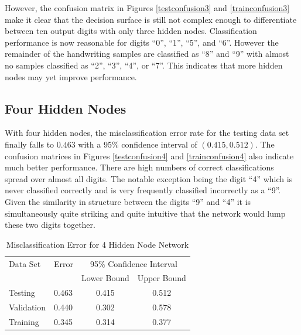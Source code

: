 \documentclass{article}
\begin{document}
However, the confusion matrix in Figures \ref{testconfusion3} and \ref{trainconfusion3} make it clear that the decision surface is still not complex enough to differentiate between ten output digits with only three hidden nodes. Classification performance is now reasonable for digits ``0'', ``1'', ``5'', and ``6''. However the remainder of the handwriting samples are classified as ``8'' and ``9'' with almost no samples classified as ``2'', ``3'', ``4'', or ``7''. This indicates that more hidden nodes may yet improve performance. 

\subsection{Four Hidden Nodes}\label{hidden4}

With four hidden nodes, the misclassification error rate for the testing data set finally falls to \(0.463\) with a 95\% confidence interval of \((0.415 , 0.512)\). The confusion matrices in Figures \ref{testconfusion4} and \ref{trainconfusion4} also indicate much better performance. There are high numbers of correct classifications spread over almost all digits. The notable exception being the digit ``4'' which is never classified correctly and is very frequently classified incorrectly as a ``9''. Given the similarity in structure between the digits ``9'' and ``4'' it is simultaneously quite striking and quite intuitive that the network would lump these two digits together.

\begin{table}
\caption{Misclassification Error for 4 Hidden Node Network}
\begin{center}
\begin{tabular}{llcc}
\toprule
Data Set & Error & \multicolumn{2}{c}{95\% Confidence Interval} \\
\cmidrule(r){3-4}
& & Lower Bound & Upper Bound \\
\midrule
Testing       & 0.463 &  0.415 & 0.512  \\
Validation    & 0.440 &  0.302 & 0.578  \\
Training      & 0.345 &  0.314 & 0.377  \\
\bottomrule
\end{tabular}
\label{table4}
\end{center}
\end{table}
\end{document}
